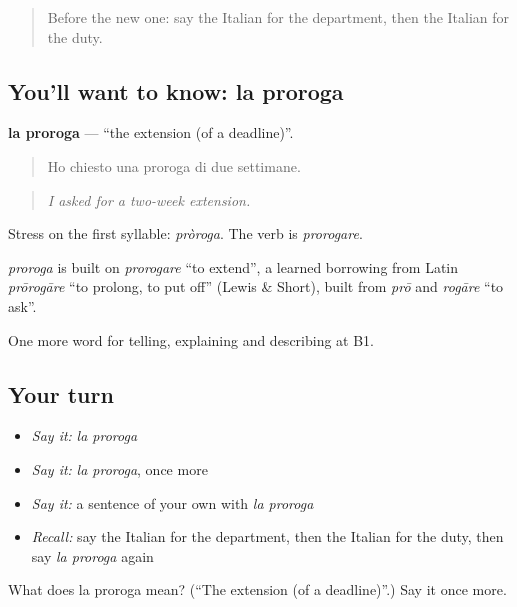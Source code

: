 \begin{quote}
Before the new one: say the Italian for the department, then the Italian for the duty.
\end{quote}

\subsection*{You'll want to know: la proroga}
\textbf{la proroga} — \textquotedblleft{}the extension (of a deadline)\textquotedblright{}.

\begin{quote}
Ho chiesto una proroga di due settimane.
\end{quote}

\begin{quote}
\emph{I asked for a two-week extension.}
\end{quote}

Stress on the first syllable: \emph{pròroga}. The verb is \emph{prorogare}.

\begin{cousinweb}
\emph{proroga} is built on \emph{prorogare} \textquotedblleft{}to extend\textquotedblright{}, a learned borrowing from Latin \emph{prōrogāre} \textquotedblleft{}to prolong, to put off\textquotedblright{} (Lewis \& Short), built from \emph{prō} and \emph{rogāre} \textquotedblleft{}to ask\textquotedblright{}.
\end{cousinweb}

\begin{grammarlens}[title={What you've built}]
One more word for telling, explaining and describing at B1.
\end{grammarlens}

\subsection*{Your turn}
\begin{itemize}
\raggedright
  \item \emph{Say it:} \emph{la proroga}
  \item \emph{Say it:} \emph{la proroga}, once more
  \item \emph{Say it:} a sentence of your own with \emph{la proroga}
  \item \emph{Recall:} say the Italian for the department, then the Italian for the duty, then say \emph{la proroga} again
\end{itemize}

\begin{tcolorbox}[breakable,colback=teal!4,colframe=teal!35!black,title={Before you move on}]
What does la proroga mean? (\textquotedblleft{}The extension (of a deadline)\textquotedblright{}.) Say it once more.
\end{tcolorbox}
